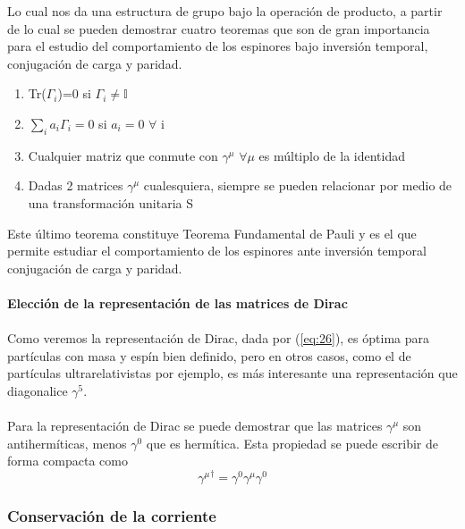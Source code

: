 \documentclass[11pt,letterpaper]{article}     %
\begin{document}
Lo cual nos da una estructura de grupo bajo la operación de producto, a partir de lo cual se pueden demostrar cuatro teoremas que son de gran importancia para el estudio del comportamiento de los espinores bajo inversión temporal, conjugación de carga y paridad.
\begin{enumerate}
\item Tr($\Gamma_i$)=0 si $\Gamma_i \neq \mathbb{I}$ 
\item $\sum_{i} a_i \Gamma_i=0$ si $a_i=0$ $\forall$ i 
\item Cualquier matriz que conmute con $\gamma^\mu$ $\forall \mu$ es múltiplo de la identidad 
\item Dadas 2 matrices $\gamma^\mu$ cualesquiera, siempre se pueden relacionar por medio de una transformación unitaria S
\end{enumerate} 
Este último teorema constituye Teorema Fundamental de Pauli y es el que permite estudiar el comportamiento de los espinores ante inversión temporal conjugación de carga y paridad. \\ \\
\textbf{Elección de la representación de las matrices de Dirac} \\ \\
Como veremos la representación de Dirac, dada por (\ref{eq:26}), es óptima para partículas con masa y espín bien definido, pero en otros casos, como el de partículas ultrarelativistas por ejemplo, es más interesante una representación que diagonalice $\gamma^5$. \\ \\
Para la representación de Dirac se puede demostrar que las matrices $\gamma^\mu$ son antihermíticas, menos $\gamma^0$ que es hermítica. Esta propiedad se puede escribir de forma compacta como
\begin{equation} \label{eq:39}
{\gamma^\mu}^\dagger = \gamma^0 \gamma^\mu \gamma^0
\end{equation}





\subsubsection{Conservación de la corriente}
\end{document}
